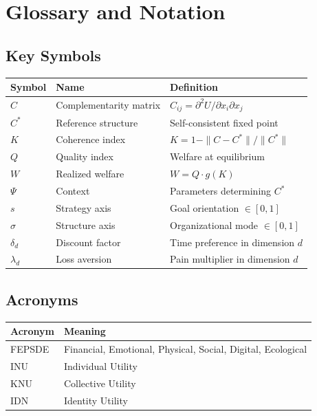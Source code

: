 \documentclass[12pt,a4paper]{article}
\begin{document}
\section{Glossary and Notation}
\label{app:glossary}

\subsection{Key Symbols}

\begin{center}
\renewcommand{\arraystretch}{1.2}
\begin{tabular}{lll}
\hline
\textbf{Symbol} & \textbf{Name} & \textbf{Definition} \\
\hline
$C$ & Complementarity matrix & $C_{ij} = \partial^2 U / \partial x_i \partial x_j$ \\
$C^*$ & Reference structure & Self-consistent fixed point \\
$K$ & Coherence index & $K = 1 - \|C - C^*\|/\|C^*\|$ \\
$Q$ & Quality index & Welfare at equilibrium \\
$W$ & Realized welfare & $W = Q \cdot g(K)$ \\
$\Psi$ & Context & Parameters determining $C^*$ \\
$s$ & Strategy axis & Goal orientation $\in [0,1]$ \\
$\sigma$ & Structure axis & Organizational mode $\in [0,1]$ \\
$\delta_d$ & Discount factor & Time preference in dimension $d$ \\
$\lambda_d$ & Loss aversion & Pain multiplier in dimension $d$ \\
\hline
\end{tabular}
\end{center}

\subsection{Acronyms}

\begin{center}
\renewcommand{\arraystretch}{1.2}
\begin{tabular}{ll}
\hline
\textbf{Acronym} & \textbf{Meaning} \\
\hline
FEPSDE & Financial, Emotional, Physical, Social, Digital, Ecological \\
INU & Individual Utility \\
KNU & Collective Utility \\
IDN & Identity Utility \\
\hline
\end{tabular}
\end{center}
\end{document}
